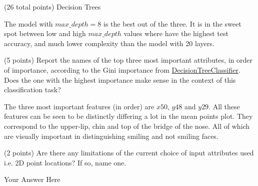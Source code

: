 \documentclass[12pt]{article}
\begin{document}
\begin{question}{(26 total points) Decision Trees}
\begin{subquestion}
\begin{answerbox}{20em}
The model with $max\_depth=8$ is the best out of the three. It is in the sweet spot between low and high $max\_depth$ values where have the highest test accuracy, and much lower complexity than the model with 20 layers.
\end{answerbox}



\end{subquestion}


%
%
\begin{subquestion}{(5 points) 
Report the names of the top three most important attributes, in order of importance, according to the Gini importance from \href{https://scikit-learn.org/0.19/modules/generated/sklearn.tree.DecisionTreeClassifier.html}{DecisionTreeClassifier}. 
Does the one with the highest importance make sense in the context of this classification task? \\
}


\begin{answerbox}{10em}
The three most important features (in order) are $x50$, $y48$ and $y29$. All these features can be seen to be distinctly differing a lot in the mean points plot. They correspond to the upper-lip, chin and top of the bridge of the nose. All of which are visually important in distinguishing smiling and not smiling faces.
\end{answerbox}



\end{subquestion}



%
%
\begin{subquestion}{(2 points) 
Are there any limitations of the current choice of input attributes used i.e. 2D point locations? If so, name one. 
}


\begin{answerbox}{10em}
Your Answer Here
\end{answerbox}



\end{subquestion}


\end{question}




\clearpage
\end{document}
